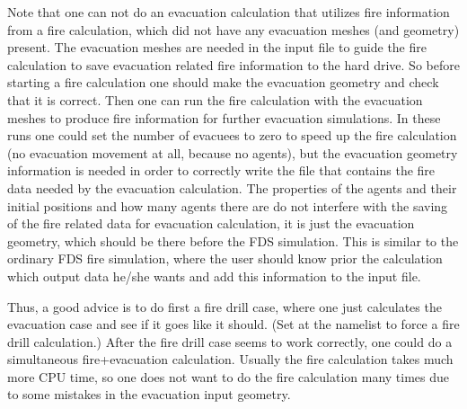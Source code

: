 \documentclass[12pt,a4paper,final,twoside]{stylevk}
\begin{document}
Note that one can not do an evacuation calculation that utilizes fire
information from a fire calculation, which did not have any evacuation
meshes (and geometry) present.  The evacuation meshes are needed in
the input file to guide the fire calculation to save evacuation
related fire information to the hard drive.  So before starting a fire
calculation one should make the evacuation geometry and check that it
is correct.  Then one can run the fire calculation with the evacuation
meshes to produce fire information for further evacuation simulations.
In these runs one could set the number of evacuees to zero to speed up
the fire calculation (no evacuation movement at all, because no
agents), but the evacuation geometry information is needed in order to
correctly write the  file that contains the fire
data needed by the evacuation calculation.  The properties of the
agents and their initial positions and how many agents there are do
not interfere with the saving of the fire related data for evacuation
calculation, it is just the evacuation geometry, which should be there
before the FDS simulation.  This is similar to the ordinary FDS fire
simulation, where the user should know prior the calculation which
output data he/she wants and add this information to the input file.


Thus, a good advice is to do first a fire drill case, where one just
calculates the evacuation case and see if it goes like it should.
(Set at the  namelist  to
force a fire drill calculation.) After the fire drill case seems to
work correctly, one could do a simultaneous fire+evacuation
calculation.  Usually the fire calculation takes much more CPU time,
so one does not want to do the fire calculation many times due to some
mistakes in the evacuation input geometry.
\end{document}
